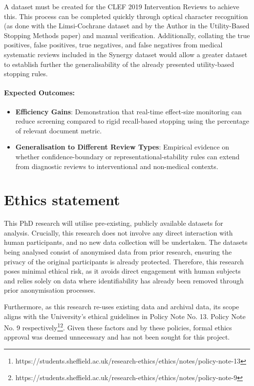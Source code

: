 \documentclass[10pt,oneside]{book}
\begin{document}
A dataset must be created for the CLEF 2019 Intervention Reviews to achieve this. This process can be completed quickly through optical character recognition (as done with the Limsi-Cochrane dataset and by the Author in the Utility-Based Stopping Methods paper) and manual verification. Additionally, collating the true positives, false positives, true negatives, and false negatives from medical systematic reviews included in the Synergy dataset would allow a greater dataset to establish further the generalisability of the already presented utility-based stopping rules. 

\paragraph{Expected Outcomes:}
\begin{itemize}
    \item \textbf{Efficiency Gains}: Demonstration that real-time effect-size monitoring can reduce screening compared to rigid recall-based stopping using the percentage of relevant document metric.
    \item \textbf{Generalisation to Different Review Types}: Empirical evidence on whether confidence-boundary or representational-stability rules can extend from diagnostic reviews to interventional and non-medical contexts.
\end{itemize}

\section{Ethics statement}\label{sec:ethics}

This PhD research will utilise pre-existing, publicly available datasets for analysis. Crucially, this research does not involve any direct interaction with human participants, and no new data collection will be undertaken. The datasets being analysed consist of anonymised data from prior research, ensuring the privacy of the original participants is already protected. Therefore, this research poses minimal ethical risk, as it avoids direct engagement with human subjects and relies solely on data where identifiability has already been removed through prior anonymisation processes.

Furthermore, as this research re-uses existing data and archival data, its scope aligns with the University's ethical guidelines in Policy Note No. 13. Policy Note No. 9 respectively\footnote{https://students.sheffield.ac.uk/research-ethics/ethics/notes/policy-note-13}\footnote{https://students.sheffield.ac.uk/research-ethics/ethics/notes/policy-note-9}. Given these factors and by these policies, formal ethics approval was deemed unnecessary and has not been sought for this project.
\end{document}
